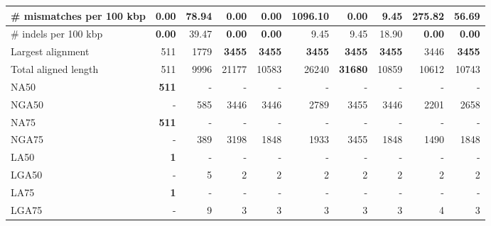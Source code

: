 \documentclass[12pt,a4paper]{article}
\begin{document}
\begin{table}[ht]
\begin{center}
\begin{tabular}{|l*{9}{|r}|}
\# mismatches per 100 kbp & {\bf 0.00} & 78.94 & {\bf 0.00} & {\bf 0.00} & 1096.10 & {\bf 0.00} & 9.45 & 275.82 & 56.69 \\ \hline
\# indels per 100 kbp & {\bf 0.00} & 39.47 & {\bf 0.00} & {\bf 0.00} & 9.45 & 9.45 & 18.90 & {\bf 0.00} & {\bf 0.00} \\ \hline
Largest alignment & 511 & 1779 & {\bf 3455} & {\bf 3455} & {\bf 3455} & {\bf 3455} & {\bf 3455} & 3446 & {\bf 3455} \\ \hline
Total aligned length & 511 & 9996 & 21177 & 10583 & 26240 & {\bf 31680} & 10859 & 10612 & 10743 \\ \hline
NA50 & {\bf 511} & - & - & - & - & - & - & - & - \\ \hline
NGA50 & - & 585 & 3446 & 3446 & 2789 & 3455 & 3446 & 2201 & 2658 \\ \hline
NA75 & {\bf 511} & - & - & - & - & - & - & - & - \\ \hline
NGA75 & - & 389 & 3198 & 1848 & 1933 & 3455 & 1848 & 1490 & 1848 \\ \hline
LA50 & {\bf 1} & - & - & - & - & - & - & - & - \\ \hline
LGA50 & - & 5 & 2 & 2 & 2 & 2 & 2 & 2 & 2 \\ \hline
LA75 & {\bf 1} & - & - & - & - & - & - & - & - \\ \hline
LGA75 & - & 9 & 3 & 3 & 3 & 3 & 3 & 4 & 3 \\ \hline
\end{tabular}
\end{center}
\end{table}
\end{document}
